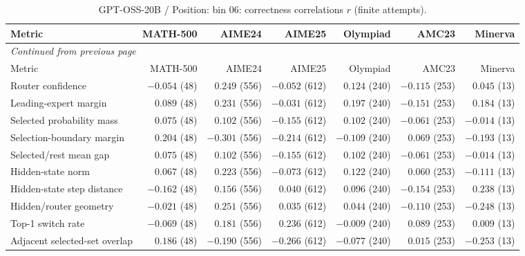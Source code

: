 \begingroup\scriptsize\setlength{\tabcolsep}{4pt}
\begin{longtable}{@{}lrrrrrr@{}}
\caption{GPT-OSS-20B / Position: bin 06: correctness correlations $r$ (finite attempts).}\label{tab:multi-gptoss-position-bin_06}\\
\toprule
Metric & MATH-500 & AIME24 & AIME25 & Olympiad & AMC23 & Minerva \\
\midrule\endfirsthead
\multicolumn{7}{l}{\textit{Continued from previous page}}\\
\toprule
Metric & MATH-500 & AIME24 & AIME25 & Olympiad & AMC23 & Minerva \\
\midrule\endhead
\bottomrule\endfoot
Router confidence & $-0.054$ (48) & $0.249$ (556) & $-0.052$ (612) & $0.124$ (240) & $-0.115$ (253) & $0.045$ (13) \\
Leading-expert margin & $0.089$ (48) & $0.231$ (556) & $-0.031$ (612) & $0.197$ (240) & $-0.151$ (253) & $0.184$ (13) \\
Selected probability mass & $0.075$ (48) & $0.102$ (556) & $-0.155$ (612) & $0.102$ (240) & $-0.061$ (253) & $-0.014$ (13) \\
Selection-boundary margin & $0.204$ (48) & $-0.301$ (556) & $-0.214$ (612) & $-0.109$ (240) & $0.069$ (253) & $-0.193$ (13) \\
Selected/rest mean gap & $0.075$ (48) & $0.102$ (556) & $-0.155$ (612) & $0.102$ (240) & $-0.061$ (253) & $-0.014$ (13) \\
Hidden-state norm & $0.067$ (48) & $0.223$ (556) & $-0.073$ (612) & $0.122$ (240) & $0.060$ (253) & $-0.111$ (13) \\
Hidden-state step distance & $-0.162$ (48) & $0.156$ (556) & $0.040$ (612) & $0.096$ (240) & $-0.154$ (253) & $0.238$ (13) \\
Hidden/router geometry & $-0.021$ (48) & $0.251$ (556) & $0.035$ (612) & $0.044$ (240) & $-0.110$ (253) & $-0.248$ (13) \\
Top-1 switch rate & $-0.069$ (48) & $0.181$ (556) & $0.236$ (612) & $-0.009$ (240) & $0.089$ (253) & $0.009$ (13) \\
Adjacent selected-set overlap & $0.186$ (48) & $-0.190$ (556) & $-0.266$ (612) & $-0.077$ (240) & $0.015$ (253) & $-0.253$ (13) \\
\end{longtable}\endgroup


